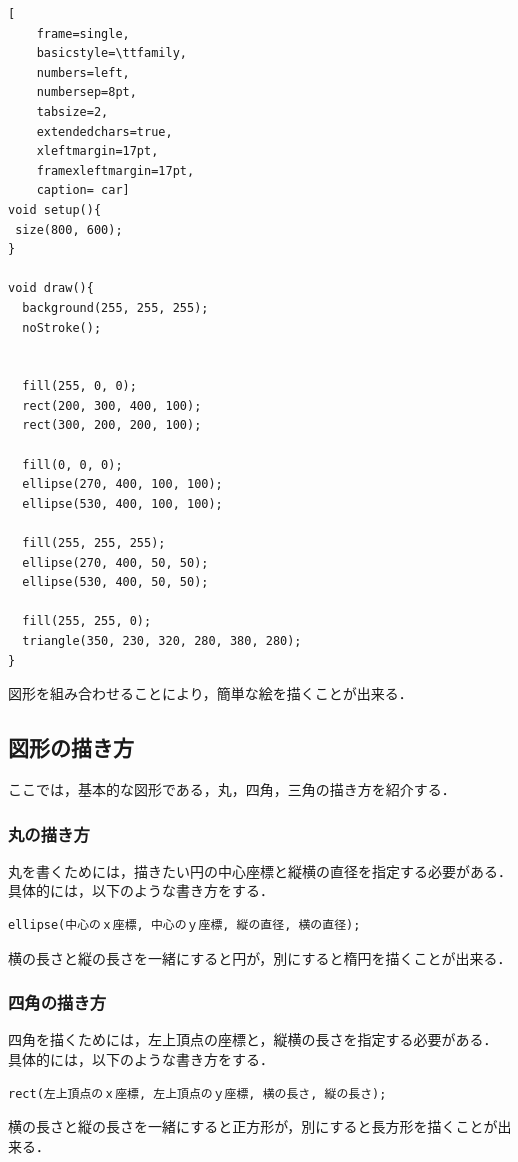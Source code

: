 \documentclass[a4j]{jarticle}
\begin{document}
\begin{lstlisting}[
	frame=single, 
	basicstyle=\ttfamily, 
	numbers=left, 
	numbersep=8pt, 
	tabsize=2,
	extendedchars=true, 
	xleftmargin=17pt, 
	framexleftmargin=17pt, 
	caption= car]
void setup(){
 size(800, 600); 
}

void draw(){
  background(255, 255, 255);
  noStroke();
  
  
  fill(255, 0, 0);
  rect(200, 300, 400, 100);
  rect(300, 200, 200, 100);

  fill(0, 0, 0);
  ellipse(270, 400, 100, 100);
  ellipse(530, 400, 100, 100);
  
  fill(255, 255, 255);
  ellipse(270, 400, 50, 50);
  ellipse(530, 400, 50, 50);
  
  fill(255, 255, 0);
  triangle(350, 230, 320, 280, 380, 280);
}
\end{lstlisting}
図形を組み合わせることにより，簡単な絵を描くことが出来る．\\

\subsection{図形の描き方}
ここでは，基本的な図形である，丸，四角，三角の描き方を紹介する．
\subsubsection{丸の描き方}
丸を書くためには，描きたい円の中心座標と縦横の直径を指定する必要がある．\\
具体的には，以下のような書き方をする．
\begin{screen}
\begin{verbatim}
ellipse(中心のｘ座標, 中心のｙ座標, 縦の直径, 横の直径);
\end{verbatim}
\end{screen}
横の長さと縦の長さを一緒にすると円が，別にすると楕円を描くことが出来る．
\subsubsection{四角の描き方}
四角を描くためには，左上頂点の座標と，縦横の長さを指定する必要がある．\\
具体的には，以下のような書き方をする．
\begin{screen}
\begin{verbatim}
rect(左上頂点のｘ座標, 左上頂点のｙ座標, 横の長さ, 縦の長さ);
\end{verbatim}
\end{screen}
横の長さと縦の長さを一緒にすると正方形が，別にすると長方形を描くことが出来る．
\end{document}
